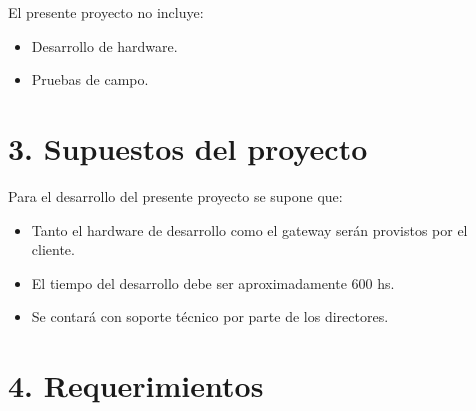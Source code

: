 \documentclass[11pt]{charter}
\begin{document}
El presente proyecto no incluye: 
\begin{itemize}
\item Desarrollo de hardware.
\item Pruebas de campo.
\end{itemize}

\section{3. Supuestos del proyecto}
\label{sec:supuestos}

Para el desarrollo del presente proyecto se supone que:

\begin{itemize}
\item Tanto el hardware de desarrollo como el gateway serán provistos por el cliente.
\item El tiempo del desarrollo debe ser aproximadamente 600 hs.
\item Se contará con soporte técnico por parte de los directores.
\end{itemize}

\section{4. Requerimientos}
\label{sec:requerimientos}
\end{document}
